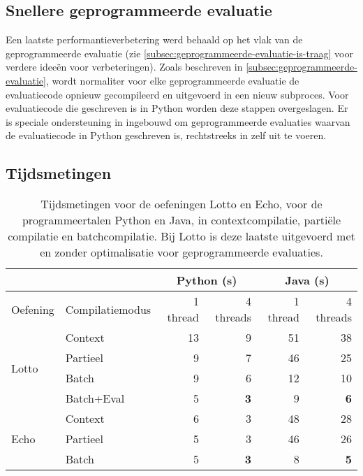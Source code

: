 \subsection{Snellere geprogrammeerde evaluatie}\label{subsec:snellere-geprogrammeerde-evaluatie}

Een laatste performantieverbetering werd behaald op het vlak van de geprogrammeerde evaluatie (zie \cref{subsec:geprogrammeerde-evaluatie-is-traag} voor verdere ideeën voor verbeteringen).
Zoals beschreven in \cref{subsec:geprogrammeerde-evaluatie}, wordt normaliter voor elke geprogrammeerde evaluatie de evaluatiecode opnieuw gecompileerd en uitgevoerd in een nieuw subproces.
Voor evaluatiecode die geschreven is in Python worden deze stappen overgeslagen.
Er is speciale ondersteuning in \tested{} ingebouwd om geprogrammeerde evaluaties waarvan de evaluatiecode in Python geschreven is, rechtstreeks in \tested{} zelf uit te voeren.

\subsection{Tijdsmetingen}\label{subsec:tijdsmetingen}

\begin{table}
    \caption{Tijdsmetingen voor de oefeningen Lotto en Echo, voor de programmeertalen Python en Java, in contextcompilatie, partiële compilatie en batchcompilatie.
    Bij Lotto is deze laatste uitgevoerd met en zonder optimalisatie voor geprogrammeerde evaluaties.}
    \label{tab:meting}
    \centering
    \begin{tabular}{ll|r|r|r|r|}
        \cline{3-6}
        & & \multicolumn{2}{c|}{Python (s)} & \multicolumn{2}{c|}{Java (s)}  \\
        \hline
        \multicolumn{1}{|l|}{Oefening}               & Compilatiemodus  & 1 thread & 4 threads & 1 thread & 4 threads \\
        \hline
        \multicolumn{1}{|l|}{\multirow{4}{*}{Lotto}} & Context          & 13       & 9         & 51       & 38        \\
        \multicolumn{1}{|l|}{}                       & Partieel         & 9        & 7         & 46       & 25        \\
        \multicolumn{1}{|l|}{}                       & Batch            & 9        & 6         & 12       & 10        \\
        \multicolumn{1}{|l|}{}                       & Batch+Eval       & 5        & \textbf{3}         & 9        & \textbf{6}         \\
        \hline
        \multicolumn{1}{|l|}{\multirow{3}{*}{Echo}}  & Context           & 6        & 3         & 48       & 28        \\
        \multicolumn{1}{|l|}{}                       & Partieel          & 5        & 3         & 46       & 26        \\
        \multicolumn{1}{|l|}{}                       & Batch             & 5        & \textbf{3}         & 8        & \textbf{5}         \\
        \hline
    \end{tabular}
\end{table}

